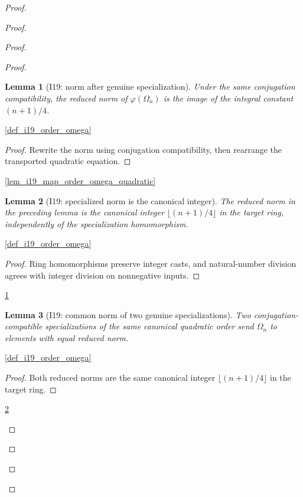 \documentclass[11pt,a4paper]{article}
\numberwithin{equation}{section}
\theoremstyle{plain}\newtheorem{theorem}{Theorem}[section]\newaliascnt{proposition}{theorem}\newtheorem{proposition}[proposition]{Proposition}\aliascntresetthe{proposition}\newaliascnt{lemma}{theorem}\newtheorem{lemma}[lemma]{Lemma}\aliascntresetthe{lemma}
\theoremstyle{definition}\newaliascnt{definition}{theorem}\newtheorem{definition}[definition]{Definition}\aliascntresetthe{definition}\newaliascnt{notation}{theorem}\newtheorem{notation}[notation]{Notation}\aliascntresetthe{notation}
\providecommand{\lean}[1]{}\providecommand{\leanok}{}
\begin{document}
\begin{proof}
\begin{proof}
\begin{proof}
\begin{proof}
\begin{lemma}[I19: norm after genuine specialization]\label{lem_i19_map_order_omega_norm}\lean{SptCM.Repair.reducedNorm_map_negativeQuadraticOmega}\leanok
Under the same conjugation compatibility, the reduced norm of
$\varphi(\Omega_n)$ is the image of the integral constant $(n+1)/4$.
\end{lemma}
\begin{uses-statement}\ref{def_i19_order_omega}\end{uses-statement}
\begin{proof}
Rewrite the norm using conjugation compatibility, then rearrange the
transported quadratic equation.
\end{proof}
\begin{uses-proof}\ref{lem_i19_map_order_omega_quadratic}\end{uses-proof}

\begin{lemma}[I19: specialized norm is the canonical integer]\label{lem_i19_map_order_omega_norm_nat}\lean{SptCM.Repair.reducedNorm_map_negativeQuadraticOmega_eq_natCast}\leanok
The reduced norm in the preceding lemma is the canonical integer
$\lfloor(n+1)/4\rfloor$ in the target ring, independently of the
specialization homomorphism.
\end{lemma}
\begin{uses-statement}\ref{def_i19_order_omega}\end{uses-statement}
\begin{proof}
Ring homomorphisms preserve integer casts, and natural-number division agrees
with integer division on nonnegative inputs.
\end{proof}
\begin{uses-proof}\ref{lem_i19_map_order_omega_norm}\end{uses-proof}

\begin{lemma}[I19: common norm of two genuine specializations]\label{lem_i19_map_order_omega_common_norm}\lean{SptCM.Repair.reducedNorm_maps_negativeQuadraticOmega_eq}\leanok
Two conjugation-compatible specializations of the same canonical quadratic
order send $\Omega_n$ to elements with equal reduced norm.
\end{lemma}
\begin{uses-statement}\ref{def_i19_order_omega}\end{uses-statement}
\begin{proof}
Both reduced norms are the same canonical integer
$\lfloor(n+1)/4\rfloor$ in the target ring.
\end{proof}
\begin{uses-proof}\ref{lem_i19_map_order_omega_norm_nat}\end{uses-proof}


\end{proof}
\end{proof}
\end{proof}
\end{proof}
\end{document}
